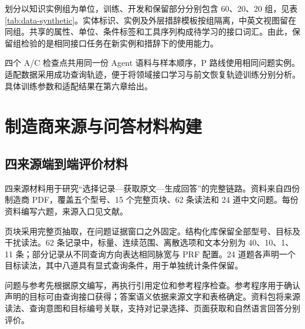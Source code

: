 \begin{table}[htbp]
\centering\small
\caption{合成接口材料划分}
\label{tab:data-synthetic}
\DataSyntheticSplitTable
\end{table}

划分以知识实例组为单位，训练、开发和保留部分分别包含 60、20、20 组，见表\ref{tab:data-synthetic}。实体标识、实例及外层措辞模板按组隔离，中英文视图留在同组。共享的属性、单位、条件标签和工具序列构成待学习的接口词汇。由此，保留组检验的是相同接口任务在新实例和措辞下的使用能力。

四个 A/C 检查点共用同一份 Agent 语料与样本顺序，P 路线使用相同问题实例。适配数据采用成功查询轨迹，便于将领域接口学习与前文恢复轨迹训练分别分析。具体训练参数和适配结果在第六章给出。

\section{制造商来源与问答材料构建}

\subsection{四来源端到端评价材料}

四来源材料用于研究“选择记录---获取原文---生成回答”的完整链路。资料来自四份制造商 PDF，覆盖五个型号、15 个完整页块、62 条读法和 24 道中文问题。每份资料编写六题，来源入口见文献\cite{domain-vaisala,domain-leonardo,domain-furuno,domain-jrc}。

\begin{table}[htbp]
\centering\small
\caption{四来源材料的文档与问题分布}
\label{tab:data-sources}
\DataSourceTable
\end{table}

\begin{table}[htbp]
\centering\small
\caption{四来源材料的量值类型分布}
\label{tab:data-values}
\DataValueTypeTable
\end{table}

页块采用完整页抽取，在问题证据窗口之外固定。结构化库保留全部型号、目标及干扰读法。62 条记录中，标量、连续范围、离散选项和文本分别为 40、10、1、11 条；部分记录从不同查询方向表达相同脉宽与 PRF 配置。24 道题各声明一个目标读法，其中八道具有显式查询条件，用于单独统计条件保留。

问题与参考先根据原文编写，再执行引用定位和参考程序检查。参考程序用于确认声明的目标可由查询接口获得；答案语义依据来源文字和表格确定。资料包将来源读法、查询意图和目标编号关联，支持对记录选择、页面获取和自然语言回答分别评价。

